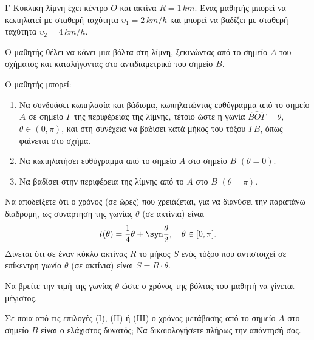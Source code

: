 \begin{thema}{Γ}
Κυκλική λίμνη έχει κέντρο $O$ και ακτίνα $R = 1\,\si{km}$. Ένας μαθητής μπορεί να κωπηλατεί με σταθερή ταχύτητα $\upsilon_1 = 2\,\si{km/h}$ και μπορεί να βαδίζει με σταθερή ταχύτητα $\upsilon_2 = 4\,\si{km/h}$.

Ο μαθητής θέλει να κάνει μια βόλτα στη λίμνη, ξεκινώντας από το σημείο $A$ του σχήματος και καταλήγοντας στο αντιδιαμετρικό του σημείο $B$.

Ο μαθητής μπορεί:
\begin{enumerate}[label=\Roman*.]
    \item Να συνδυάσει κωπηλασία και βάδισμα, κωπηλατώντας ευθύγραμμα από το σημείο $A$ σε σημείο $\Gamma$ της περιφέρειας της λίμνης, τέτοιο ώστε η γωνία $\widehat{B O \Gamma} = \theta$, $\theta \in (0, \pi)$, και στη συνέχεια να βαδίσει κατά μήκος του τόξου $\Gamma B$, όπως φαίνεται στο σχήμα.
    \item Να κωπηλατήσει ευθύγραμμα από το σημείο $A$ στο σημείο $B$ $(\theta = 0)$.
    \item Να βαδίσει στην περιφέρεια της λίμνης από το $A$ στο $B$ $(\theta = \pi)$.
\end{enumerate}
\begin{erwthma}
    \item Να αποδείξετε ότι ο χρόνος (σε ώρες) που χρειάζεται, για να διανύσει την παραπάνω διαδρομή, ως συνάρτηση της γωνίας $\theta$ (σε ακτίνια) είναι
    \[
    t(\theta) = \frac{1}{4}\theta + \syn\frac{\theta}{2}, \quad \theta \in [0, \pi].
    \]
    Δίνεται ότι σε έναν κύκλο ακτίνας $R$ το μήκος $S$ ενός τόξου που αντιστοιχεί σε επίκεντρη γωνία $\theta$ (σε ακτίνια) είναι $S = R \cdot \theta$. 

    \item Να βρείτε την τιμή της γωνίας $\theta$ ώστε ο χρόνος της βόλτας του μαθητή να γίνεται μέγιστος. 

    \item Σε ποια από τις επιλογές (Ι), (ΙΙ) ή (ΙΙΙ) ο χρόνος μετάβασης από το σημείο $A$ στο σημείο $B$ είναι ο ελάχιστος δυνατός; Να δικαιολογήσετε πλήρως την απάντησή σας. 
\end{erwthma}
\end{thema}

